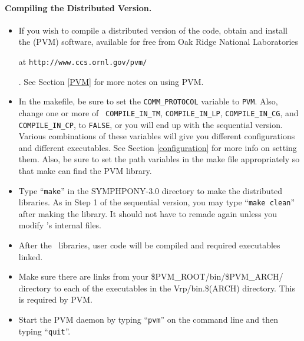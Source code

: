 \paragraph{Compiling the Distributed Version.}

\begin{itemize}
        \item If you wish to compile a distributed version of the code, obtain
and install the {\em {}} (PVM) software, available for free
from Oak Ridge National Laboratories
\begin{latexonly}
        at {\tt http://www.ccs.ornl.gov/pvm/}
\end{latexonly}. 
        See Section \ref{PVM} for more notes on using PVM.
        
        \item In the makefile, be sure to set the {\tt COMM\_PROTOCOL}
        variable to {\tt PVM}. Also, change one or more of {\tt
        COMPILE\_IN\_TM}, {\tt COMPILE\_IN\_LP}, {\tt COMPILE\_IN\_CG}, and
        {\tt COMPILE\_IN\_CP}, to {\tt FALSE}, or you will end up with the
        sequential version. Various combinations of these variables will give
        you different configurations and different executables. See Section
        \ref{configuration} for more info on setting them. Also, be sure to
        set the path variables in the make file appropriately so that make can
        find the PVM library.

        \item Type ``{\tt make}'' in the SYMPHPONY-3.0 directory to
        make the distributed libraries. As in Step 1 of the sequential
        version, you may type ``{\tt make clean}'' after making the
        library. It should not have to remade again unless you modify
        \BB's internal files.

        \item After the \BB\ libraries, user code will be compiled and
        required executables linked.

        \item Make sure there are links from your
        \$PVM\_ROOT/bin/\$PVM\_ARCH/ directory to each of the
        executables in the Vrp/bin.\$(ARCH) directory. This is required
        by PVM.

        \item Start the PVM daemon by typing ``{\tt pvm}'' on the command line
        and then typing ``{\tt quit}''.


\end{itemize}
